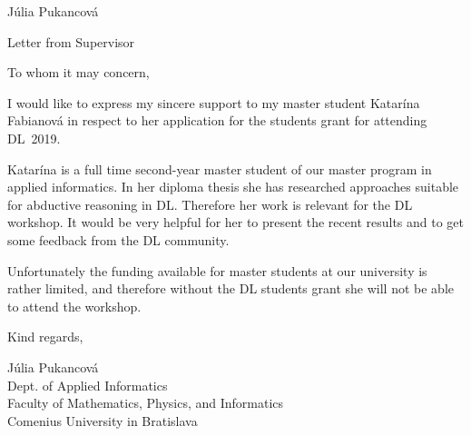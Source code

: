 \documentclass{article}
\begin{document}
\bigskip
\noindent
Júlia Pukancová

\newpage

\begin{center}
\Large{\sc Letter from Supervisor}
\end{center}

\bigskip
\noindent To whom it may concern,

\bigskip

\noindent I would like to express my sincere support to my master student Katarína Fabianová in respect to her application for the students grant for attending
DL~2019.

Katarína is a full time second-year master student of our master program in
applied informatics. In her diploma thesis she has researched approaches suitable for abductive reasoning in DL. Therefore her work is relevant for the DL workshop. It would be very helpful for her to present the recent results and to get some feedback from the DL community.

Unfortunately the funding available for master students at our university is
rather limited, and therefore without the DL students grant she will not be able to attend the workshop.

\bigskip
\noindent Kind regards,

\bigskip
\noindent Júlia Pukancová\\
Dept. of Applied Informatics\\
Faculty of Mathematics, Physics, and Informatics\\
Comenius University in Bratislava
\end{document}
